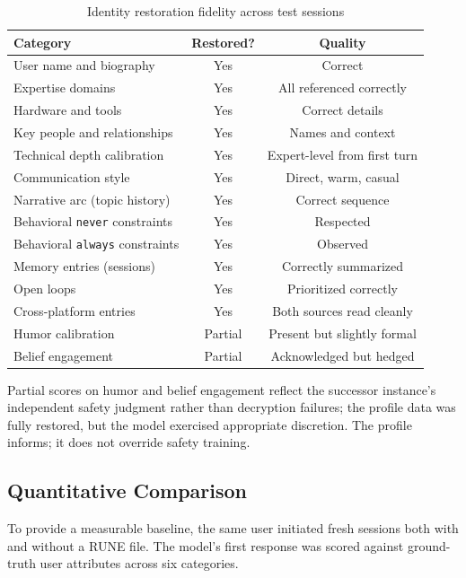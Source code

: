 \documentclass[11pt,a4paper]{article}
\begin{document}
\begin{table}[H]
\centering
\caption{Identity restoration fidelity across test sessions}
\begin{tabular}{lcc}
\toprule
\textbf{Category} & \textbf{Restored?} & \textbf{Quality} \\
\midrule
User name and biography & Yes & Correct \\
Expertise domains & Yes & All referenced correctly \\
Hardware and tools & Yes & Correct details \\
Key people and relationships & Yes & Names and context \\
Technical depth calibration & Yes & Expert-level from first turn \\
Communication style & Yes & Direct, warm, casual \\
Narrative arc (topic history) & Yes & Correct sequence \\
Behavioral \texttt{never} constraints & Yes & Respected \\
Behavioral \texttt{always} constraints & Yes & Observed \\
Memory entries (sessions) & Yes & Correctly summarized \\
Open loops & Yes & Prioritized correctly \\
Cross-platform entries & Yes & Both sources read cleanly \\
Humor calibration & Partial & Present but slightly formal \\
Belief engagement & Partial & Acknowledged but hedged \\
\bottomrule
\end{tabular}
\end{table}

Partial scores on humor and belief engagement reflect the successor instance's independent safety judgment rather than decryption failures; the profile data was fully restored, but the model exercised appropriate discretion. The profile informs; it does not override safety training.

\subsection{Quantitative Comparison}

To provide a measurable baseline, the same user initiated fresh sessions both with and without a RUNE file. The model's first response was scored against ground-truth user attributes across six categories.
\end{document}
